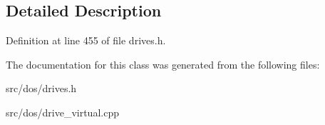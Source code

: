 \subsection{Detailed Description}


Definition at line 455 of file drives.\-h.



The documentation for this class was generated from the following files\-:\begin{DoxyCompactItemize}
\item 
src/dos/drives.\-h\item 
src/dos/drive\-\_\-virtual.\-cpp\end{DoxyCompactItemize}
